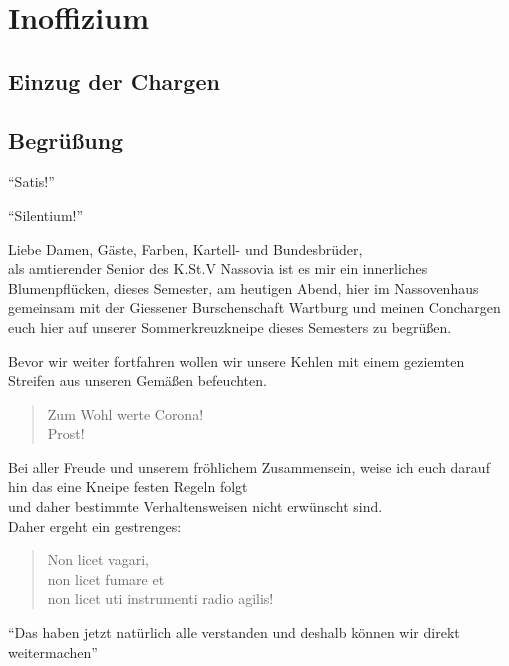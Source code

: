 %

\chapter{Inoffizium}


\section{Einzug der Chargen}
\section{Begrüßung}

\enquote{Satis!}

\enquote{Silentium!} 

Liebe Damen, Gäste, Farben, Kartell- und Bundesbrüder,\\
als amtierender Senior des K.St.V Nassovia ist es mir ein innerliches 
Blumenpflücken, dieses Semester, am heutigen Abend, hier im Nassovenhaus 
gemeinsam mit der Giessener Burschenschaft Wartburg und meinen Conchargen
euch hier auf unserer Sommerkreuzkneipe dieses Semesters zu begrüßen.

Bevor wir weiter fortfahren wollen wir unsere Kehlen mit einem geziemten
Streifen aus unseren Gemäßen befeuchten.


\begin{quote}
Zum Wohl werte Corona!\\
Prost!
\end{quote}

Bei aller Freude und unserem fröhlichem Zusammensein,
weise ich euch darauf hin das eine Kneipe festen Regeln folgt\\
und daher bestimmte Verhaltensweisen nicht erwünscht sind.\\
Daher ergeht ein gestrenges:
\begin{quote}
    Non licet vagari,\\
    non licet fumare et\\
    non licet uti instrumenti radio agilis!\\
\end{quote}
\enquote{Das haben jetzt natürlich alle verstanden und deshalb können wir direkt weitermachen}

